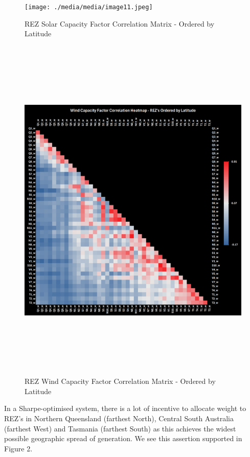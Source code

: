 \documentclass[
  letterpaper,
  DIV=11,
  numbers=noendperiod]{scrartcl}
\begin{document}
\begin{figure}[H]

{\centering \texttt{[image: ./media/media/image11.jpeg]}

}

\caption{REZ Solar Capacity Factor Correlation Matrix - Ordered by
Latitude}

\end{figure}%
\begin{figure}[H]

{\centering \includegraphics[width=6.88333in,height=6.68471in]{./media/media/image12.png}

}

\caption{REZ Wind Capacity Factor Correlation Matrix - Ordered by
Latitude}

\end{figure}%

In a Sharpe-optimised system, there is a lot of incentive to allocate
weight to REZ's in Northern Queensland (farthest North), Central South
Australia (farthest West) and Tasmania (farthest South) as this achieves
the widest possible geographic spread of generation. We see this
assertion supported in Figure 2.
\end{document}
